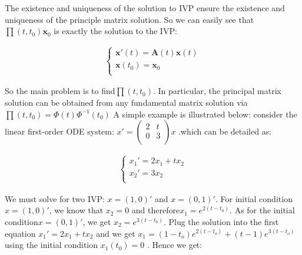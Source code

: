 \documentclass[a4paper]{article}
\begin{document}
The existence and uniqueness of the solution to IVP ensure the existence and uniqueness of the principle matrix solution. So we can easily see that $\prod (t,{{t}_{0}}){{\mathbf{x}}_{0}}$ is exactly the solution to the IVP:

\begin{eqnarray}     %
\left\{                       %
\begin{array}{lll}       %
\mathbf{x'}(t)=\mathbf{A}(t)\mathbf{x}(t) \\
\mathbf{x}({{t}_{0}})={{\mathbf{x}}_{0}} \\
\end{array}              %
\right.                       %
\end{eqnarray}

So the main problem is to find$\prod (t,{{t}_{0}})$. In particular, the principal matrix solution can be obtained from any fundamental matrix solution via $\prod (t,{{t}_{0}})=\Phi (t){{\Phi }^{-1}}({{t}_{0}})$
A simple example is illustrated below: consider the linear first-order ODE system:
$x'=\left( \begin{matrix}
   2 & t  \\
   0 & 3  \\
\end{matrix} \right)x$
.which can be detailed as:

\begin{eqnarray}     %
\left\{                       %
\begin{array}{lll}       %
{{x}_{1}}'=2{{x}_{1}}+t{{x}_{2}} \\
{{x}_{2}}'=3{{x}_{2}} \\
\end{array}              %
\right.                       %
\end{eqnarray}

We must solve for two IVP: $x=(1,0)'$ and $x=(0,1)'$. For initial condition$x=(1,0)'$, we know that ${{x}_{2}}=0$ and therefore${{x}_{1}}={{e}^{2(t-{{t}_{0}})}}$. As for the initial condition$x=(0,1)'$, we get ${{x}_{2}}={{e}^{3(t-{{t}_{0}})}}$. Plug the solution into the first equation ${{x}_{1}}'=2{{x}_{1}}+t{{x}_{2}}$ and we get ${{x}_{1}}=(1-{{t}_{o}}){{e}^{2(t-{{t}_{o}})}}+(t-1){{e}^{3(t-{{t}_{o}})}}$ using the initial condition ${{x}_{1}}({{t}_{0}})=0$ . Hence we get:
\end{document}
